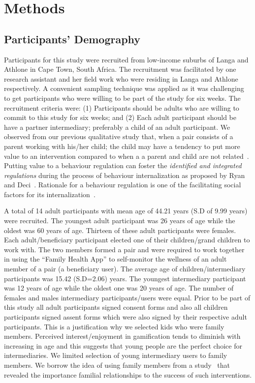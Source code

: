 \documentclass{sig-alternate}
\begin{document}
\section{Methods}
\subsection{Participants' Demography}
Participants for this study were recruited from low-income suburbs of Langa and Athlone in Cape Town, South Africa. The recruitment was facilitated by one research assistant and her field work who were residing in Langa and Athlone respectively. A convenient sampling technique was applied as it was challenging to get participants who were willing to be part of the study for six weeks.  The recruitment criteria were: (1) Participants should be adults who are willing to commit to this study for six weeks; and (2) Each adult participant should be have a partner intermediary; preferably a child of an adult participant. We observed from our previous qualitative study that, when a pair consists of a parent working with his/her child; the child may have a tendency to put more value to an intervention compared to when a a parent and child are not related~\cite{katule2016:leveraging}. Putting value to a behaviour regulation can foster the \emph{identified and integrated regulations} during the process of behaviour internalization as proposed by Ryan and Deci~\cite{ryan2000intrinsic}. Rationale for a behaviour regulation is one of the facilitating social factors for  its internalization~\cite{deci1994facilitating}. 

A total of 14 adult participants with mean age of 44.21 years (S.D of 9.99 years) were recruited.  The youngest adult participant was 26 years of age while the oldest was 60 years of age. Thirteen of these adult participants were females. Each adult/beneficiary participant  elected one of their children/grand children to work with. The two members formed a pair and were required to work together in using the ``Family Health App'' to self-monitor the wellness of an adult member of a pair (a beneficiary user). The average age of children/intermediary participants was 15.42 (S.D=2.06) years. The youngest intermediary participant was 12 years of age while the oldest one was 20 years of age. The number of females and males intermediary participants/users were equal. Prior to be part of this study all adult participants signed consent forms and also all children participants signed assent forms which were also signed by their respective adult participants. This is a justification why we selected kids who were family members. Perceived interest/enjoyment in gamification tends to diminish with increasing in age \cite{v2014motivational} and this suggests that young people are the perfect choice for intermediaries. We limited selection of young intermediary users to family members. We borrow the idea of using family members from a study~\cite{katule2016:leveraging} that revealed the importance familial relationships to the success of such interventions.
\end{document}
